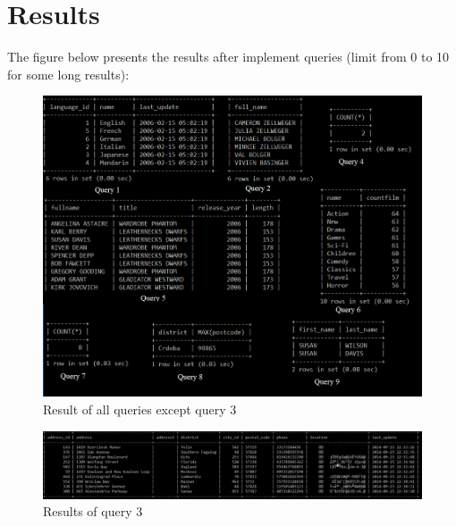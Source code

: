 \documentclass{article}
\begin{document}
\section*{Results}

The figure below presents the results after implement queries (limit from 0 to 10 for some long results):\\
\begin{figure}
\centering
\includegraphics[scale = 0.72]{result.PNG}
\caption{Result of all queries except query 3}
\end{figure}

\begin{figure}
\includegraphics[scale = 0.45]{result3.PNG}
\caption{Results of query 3}
\end{figure}
\end{document}
